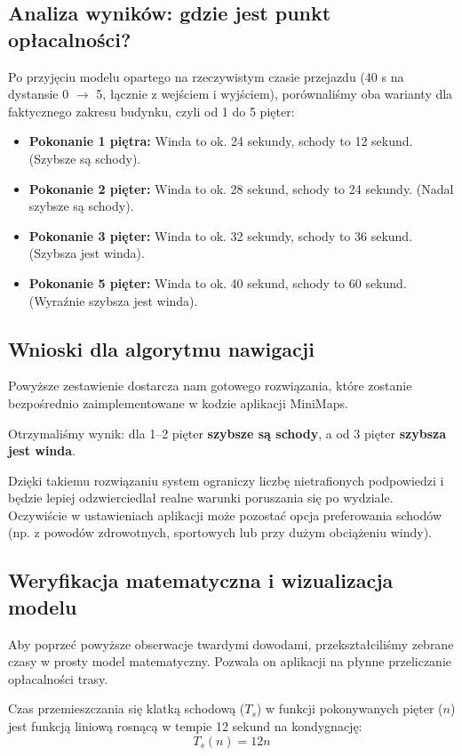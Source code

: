 \documentclass[14pt,a4paper]{extarticle}
\begin{document}
\subsection{Analiza wyników: gdzie jest punkt opłacalności?}
Po przyjęciu modelu opartego na rzeczywistym czasie przejazdu (40 s na dystansie 0 $\rightarrow$ 5, łącznie z wejściem i wyjściem), porównaliśmy oba warianty dla faktycznego zakresu budynku, czyli od 1 do 5 pięter:

\begin{itemize}
    \item \textbf{Pokonanie 1 piętra:} Winda to ok. 24 sekundy, schody to 12 sekund. (Szybsze są schody).
    \item \textbf{Pokonanie 2 pięter:} Winda to ok. 28 sekund, schody to 24 sekundy. (Nadal szybsze są schody).
    \item \textbf{Pokonanie 3 pięter:} Winda to ok. 32 sekundy, schody to 36 sekund. (Szybsza jest winda).
    \item \textbf{Pokonanie 5 pięter:} Winda to ok. 40 sekund, schody to 60 sekund. (Wyraźnie szybsza jest winda).
\end{itemize}

\subsection{Wnioski dla algorytmu nawigacji}
Powyższe zestawienie dostarcza nam gotowego rozwiązania, które zostanie bezpośrednio zaimplementowane w kodzie aplikacji MiniMaps.

Otrzymaliśmy wynik: dla 1--2 pięter \textbf{szybsze są schody}, a od 3 pięter \textbf{szybsza jest winda}.

Dzięki takiemu rozwiązaniu system ograniczy liczbę nietrafionych podpowiedzi i będzie lepiej odzwierciedlał realne warunki poruszania się po wydziale. Oczywiście w ustawieniach aplikacji może pozostać opcja preferowania schodów (np. z powodów zdrowotnych, sportowych lub przy dużym obciążeniu windy).

\subsection{Weryfikacja matematyczna i wizualizacja modelu}

Aby poprzeć powyższe obserwacje twardymi dowodami, przekształciliśmy zebrane czasy w prosty model matematyczny. Pozwala on aplikacji na płynne przeliczanie opłacalności trasy.

Czas przemieszczania się klatką schodową ($T_s$) w funkcji pokonywanych pięter ($n$) jest funkcją liniową rosnącą w tempie 12 sekund na kondygnację:
\begin{equation}
    T_s(n) = 12n
\end{equation}
\end{document}
